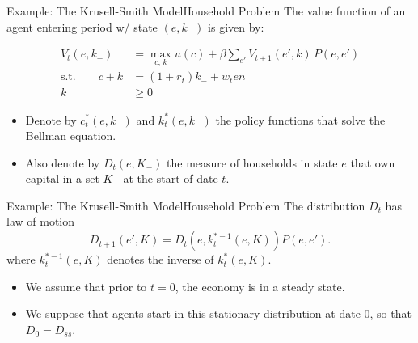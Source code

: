 \documentclass[aspectratio=169]{beamer}
\begin{document}
\begin{frame}{Example: The Krusell-Smith Model}{Household Problem}
    The value function of an agent entering period w/ state $(e,k_-)$ is given by:

    \begin{align*}
        V_t(e, k_-)               & = \max_{c,\,k}  u(c) + \beta \sum_{e'} V_{t+1}(e', k) \, P(e,e') \\
        \text{s.t.} \qquad  c + k & = (1 + r_t)k_- + w_t e n                                         \\
        k                         & \geq 0
    \end{align*}

    \begin{itemize}
        \item Denote by $c^*_t(e, k_-)$ and $k^*_t(e, k_-)$ the policy functions that solve the Bellman equation.
        \item Also denote by $D_t(e, K_-)$ the measure of households in state $e$ that own capital in a set $K_-$ at the start of date $t$.
    \end{itemize}
\end{frame}


\begin{frame}{Example: The Krusell-Smith Model}{Household Problem}
    The distribution $D_t$ has law of motion
    \[
        D_{t+1}(e', K) = D_t(e, k^{*-1}_t(e, K)) P(e,e').
    \]
    where $k^{*-1}_t(e, K)$ denotes the inverse of $k^*_t(e, K)$.

    \begin{itemize}
        \item We assume that prior to $t = 0$, the economy is in a steady state.
        \item We suppose that agents start in this stationary distribution at date $0$, so that $D_0 = D_{ss}$.
    \end{itemize}

\end{frame}
\end{document}
